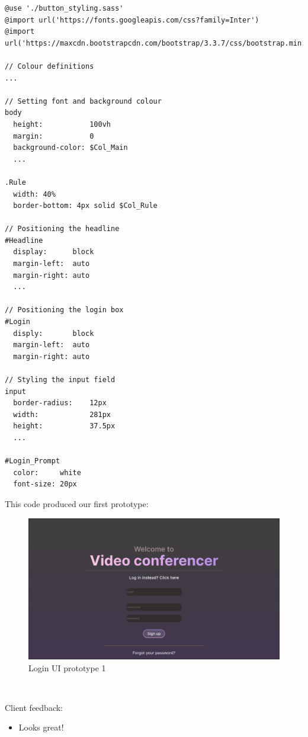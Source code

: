 \begin{verbatim}
@use './button_styling.sass'
@import url('https://fonts.googleapis.com/css?family=Inter')
@import url('https://maxcdn.bootstrapcdn.com/bootstrap/3.3.7/css/bootstrap.min.css')

// Colour definitions
...

// Setting font and background colour
body
  height:           100vh
  margin:           0
  background-color: $Col_Main
  ...

.Rule
  width: 40%
  border-bottom: 4px solid $Col_Rule

// Positioning the headline
#Headline
  display:      block
  margin-left:  auto
  margin-right: auto
  ...

// Positioning the login box
#Login
  disply:       block
  margin-left:  auto
  margin-right: auto

// Styling the input field
input
  border-radius:    12px
  width:            281px
  height:           37.5px
  ...

#Login_Prompt
  color:     white
  font-size: 20px
\end{verbatim}

This code produced our first prototype:

\begin{figure}[H]
  \centering
  \includegraphics[scale=0.2]{Images/LoginUI.png}
  \caption{Login UI prototype 1}
\end{figure}

{\color{gray} \hrulefill} \\ \vspace{0.2cm}

{\sffamily Client feedback:}

\begin{itemize}
  \item Looks great!
\end{itemize}

